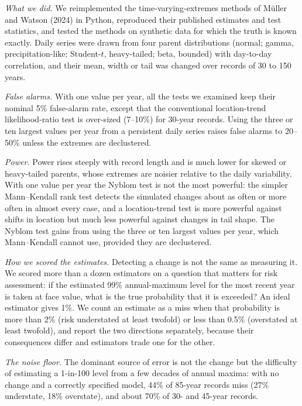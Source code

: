 \documentclass[11pt]{article}
\begin{document}
\emph{What we did.} We reimplemented the time-varying-extremes methods of M\"uller and Watson (2024)
in Python, reproduced their published estimates and test statistics, and tested the methods on
synthetic data for which the truth is known exactly. Daily series were drawn from four parent
distributions (normal; gamma, precipitation-like; Student-$t$, heavy-tailed; beta, bounded) with
day-to-day correlation, and their mean, width or tail was changed over records of 30 to 150 years.

\emph{False alarms.} With one value per year, all the tests we examined keep their nominal 5\%
false-alarm rate, except that the conventional location-trend likelihood-ratio test is over-sized
(7--10\%) for 30-year records. Using the three or ten largest values per year from a persistent
daily series raises false alarms to 20--50\% unless the extremes are declustered.

\emph{Power.} Power rises steeply with record length and is much lower for skewed or heavy-tailed
parents, whose extremes are noisier relative to the daily variability. With one value per year the
Nyblom test is not the most powerful: the simpler Mann--Kendall rank test detects the simulated
changes about as often or more often in almost every case, and a location-trend test is more
powerful against shifts in location but much less powerful against changes in tail shape. The
Nyblom test gains from using the three or ten largest values per year, which Mann--Kendall cannot
use, provided they are declustered.

\emph{How we scored the estimates.} Detecting a change is not the same as measuring it. We scored
more than a dozen estimators on a question that matters for risk assessment: if the estimated 99\%
annual-maximum level for the most recent year is taken at face value, what is the true probability
that it is exceeded? An ideal estimator gives 1\%. We count an estimate as a miss when that
probability is more than 2\% (risk understated at least twofold) or less than 0.5\% (overstated at
least twofold), and report the two directions separately, because their consequences differ and
estimators trade one for the other.

\emph{The noise floor.} The dominant source of error is not the change but the difficulty of
estimating a 1-in-100 level from a few decades of annual maxima: with no change and a correctly
specified model, 44\% of 85-year records miss (27\% understate, 18\% overstate), and about 70\% of
30- and 45-year records.
\end{document}
